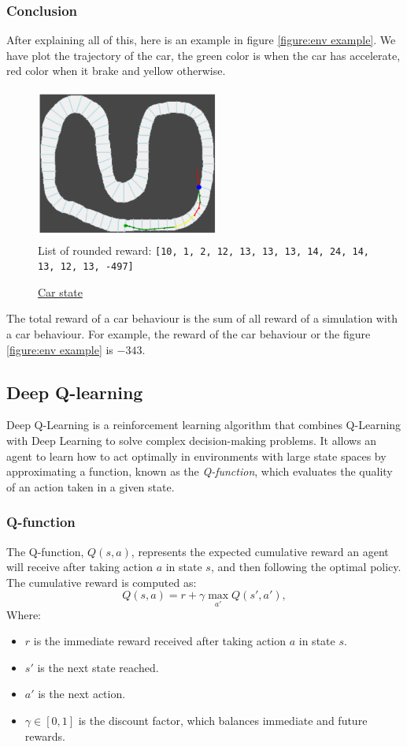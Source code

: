 \documentclass[11pt,a4paper]{article}
\newcounter{fig}
\begin{document}
			\subsubsection{Conclusion}
After explaining all of this, here is an example in figure \ref{figure:env example}. We have plot the trajectory of the car, the green color is when the car has accelerate, red color when it brake and yellow otherwise.
\begin{center}
\label{figure:env example}
	\begin{figure}[ht]
		\centering
		\includegraphics[width=6cm, height=5cm]{env_example.png}\\
		List of rounded reward: \texttt{[10, 1, 2, 12, 13, 13, 13, 14, 24, 14, 13, 12, 13, -497]}
		\caption{\underline{Car state}}
	\end{figure}
\end{center}
The total reward of a car behaviour is the sum of all reward of a simulation with a car behaviour. For example, the reward of the car behaviour or the figure \ref{figure:env example} is $-343$.


		\subsection{Deep Q-learning}
			Deep Q-Learning is a reinforcement learning algorithm that combines Q-Learning with Deep Learning to solve complex decision-making problems. 
    It allows an agent to learn how to act optimally in environments with large state spaces by approximating a function, known as the \textit{Q-function}, which evaluates the quality of an action taken in a given state.
    
            \subsubsection{Q-function}
    The Q-function, $Q(s, a)$, represents the expected cumulative reward an agent will receive after taking action $a$ in state $s$, and then following the optimal policy. The cumulative reward is computed as:
    \[
    Q(s, a) = r + \gamma \max_{a'} Q(s', a'),
    \]
    Where:
    \begin{itemize}
        \item $r$ is the immediate reward received after taking action $a$ in state $s$.
        \item $s'$ is the next state reached.
        \item $a'$ is the next action.
        \item $\gamma \in [0, 1]$ is the discount factor, which balances immediate and future rewards.
    \end{itemize}
    
\end{document}
